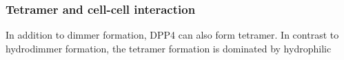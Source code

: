 \subsubsection{Tetramer and cell-cell interaction}

In addition to dimmer formation, DPP4 can also form tetramer. In contrast to hydrodimmer formation, the tetramer formation is dominated by hydrophilic 
